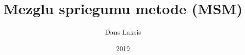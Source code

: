 \documentclass{beamer}
\title{Mezglu spriegumu metode (MSM)}
\author{Dans Laksis}
\institute{\LaTeX}
\date{2019}
\begin{document}
 
\frame{\titlepage} %
 
 












\end{document}
